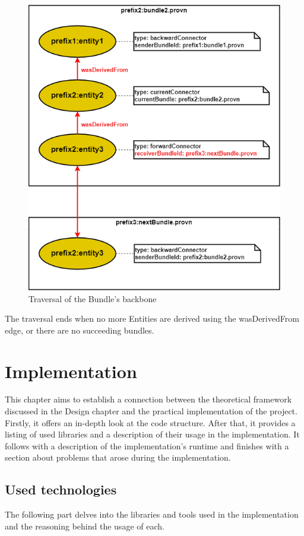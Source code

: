 \documentclass[
  digital,     %
  oneside,     %
  nosansbold,  %
  nocolorbold, %
  lof,         %
  lot,         %
]{fithesis4}
\begin{document}
\begin{figure}[htbp]
  \begin{center}
    \includegraphics[width=12cm]{fithesis/images/algorithm-Continue.png}
  \end{center}
  \caption{Traversal of the Bundle's backbone}
  \label{fig:algorithm-Continue}
\end{figure}

The traversal ends when no more Entities are derived using the wasDerivedFrom edge, or there are no succeeding bundles.


\chapter{Implementation}
\shorthandoff{-}
This chapter aims to establish a connection between the theoretical framework discussed in the Design chapter and the practical implementation of the project. Firstly, it offers an in-depth look at the code structure. After that, it provides a listing of used libraries and a description of their usage in the implementation. It follows with a description of the implementation's runtime and finishes with a section about problems that arose during the implementation.

\section{Used technologies}
The following part delves into the libraries and tools used in the implementation and the reasoning behind the usage of each.
\end{document}
